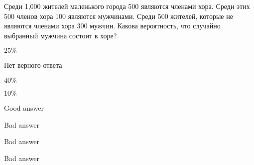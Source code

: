 
\begin{question}
Среди 1,000 жителей маленького города 500 являются членами хора.
Среди этих 500 членов хора 100 являются мужчинами.
Среди 500 жителей, которые не являются членами хора 300 мужчин.
Какова вероятность, что случайно выбранный мужчина состоит в хоре?
\begin{answerlist}
  \item \(25 \%\)
  \item Нет верного ответа
  \item \(40 \%\)
  \item \(10 \%\)
\end{answerlist}
\end{question}

\begin{solution}
\begin{answerlist}
  \item Good answer
  \item Bad answer
  \item Bad answer
  \item Bad answer
\end{answerlist}
\end{solution}

